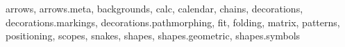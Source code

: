 arrows,
arrows.meta,
backgrounds,
calc,
calendar,
chains,
decorations,
decorations.markings,
decorations.pathmorphing,
fit,
folding,
matrix,
patterns,
positioning,
scopes,
snakes,
shapes,
shapes.geometric,
shapes.symbols
